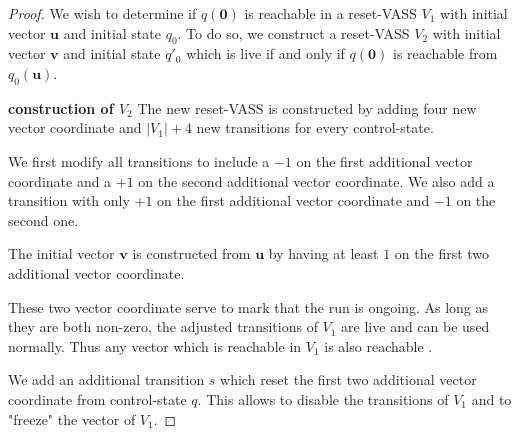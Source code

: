 \begin{proof}


We wish to determine if $q(\textbf{0})$ is reachable in a reset-VASS $V_1$
with
initial vector $\textbf{u}$ and initial state $q_0$.
To do so, we construct a reset-VASS $V_2$
with initial vector $\textbf{v}$ and initial state $q'_0$ 
which is live if and only if 
$q(\textbf{0})$
is reachable from $q_0(\textbf{u})$.

{\bf construction of $V_2$}
The new reset-VASS is constructed by adding four new vector coordinate
and
$|V_1|+4$ new transitions for every control-state.

We first modify all transitions to include a $-1$ on the first additional vector coordinate and a $+1$ on the second additional vector coordinate. We also add a transition with only $+1$ on the first additional vector coordinate and $-1$ on the second one.



The initial vector $\textbf{v}$ is constructed from $\textbf{u}$ by having at least $1$ on the first two additional vector coordinate.


These two vector coordinate serve to mark that the run is ongoing. As long as they are both non-zero, the adjusted transitions of $V_1$ are live and can be used normally. Thus any vector which is reachable in $V_1$ is also reachable%
.



We add an additional transition $s$ 
which reset the first two additional vector coordinate from control-state $q$.
This allows to disable the transitions of $V_1$ and to "freeze" the vector of $V_1$.


\end{proof}
